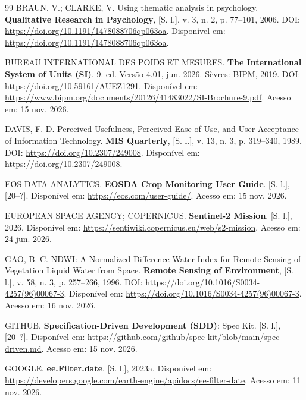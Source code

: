 \begin{thebibliography}{99}
\MakeUppercase{Braun}, V.; \MakeUppercase{Clarke}, V.
Using thematic analysis in psychology.
\textbf{Qualitative Research in Psychology}, [S. l.],
v. 3,
n. 2,
p. 77--101,
2006.
DOI: \url{https://doi.org/10.1191/1478088706qp063oa}.
Disponível em: \url{https://doi.org/10.1191/1478088706qp063oa}.

\MakeUppercase{{Bureau International des Poids et Mesures}}.
\textbf{The International System of Units (SI)}.
9. ed.
Versão 4.01, jun. 2026.
Sèvres: BIPM, 2019.
DOI: \url{https://doi.org/10.59161/AUEZ1291}.
Disponível em: \url{https://www.bipm.org/documents/20126/41483022/SI-Brochure-9.pdf}.
Acesso em: 15 nov. 2026.

\MakeUppercase{Davis}, F. D.
Perceived Usefulness, Perceived Ease of Use, and User Acceptance of Information Technology.
\textbf{MIS Quarterly}, [S. l.],
v. 13,
n. 3,
p. 319--340,
1989.
DOI: \url{https://doi.org/10.2307/249008}.
Disponível em: \url{https://doi.org/10.2307/249008}.

\MakeUppercase{{EOS Data Analytics}}.
\textbf{{EOSDA Crop Monitoring User Guide}}.
[S. l.], [20--?].
Disponível em: \url{https://eos.com/user-guide/}.
Acesso em: 15 nov. 2026.

\MakeUppercase{{European Space Agency}}; \MakeUppercase{{Copernicus}}.
\textbf{{Sentinel-2 Mission}}.
[S. l.], 2026.
Disponível em: \url{https://sentiwiki.copernicus.eu/web/s2-mission}.
Acesso em: 24 jun. 2026.

\MakeUppercase{Gao}, B.-C.
{NDWI}: A Normalized Difference Water Index for Remote Sensing of Vegetation Liquid Water from Space.
\textbf{Remote Sensing of Environment}, [S. l.],
v. 58,
n. 3,
p. 257--266,
1996.
DOI: \url{https://doi.org/10.1016/S0034-4257(96)00067-3}.
Disponível em: \url{https://doi.org/10.1016/S0034-4257(96)00067-3}.
Acesso em: 16 nov. 2026.

\MakeUppercase{{GitHub}}.
\textbf{Specification-Driven Development ({SDD})}: {Spec Kit}.
[S. l.], [20--?].
Disponível em: \url{https://github.com/github/spec-kit/blob/main/spec-driven.md}.
Acesso em: 15 nov. 2026.

\MakeUppercase{{Google}}.
\textbf{{ee.Filter.date}}.
[S. l.], 2023a.
Disponível em: \url{https://developers.google.com/earth-engine/apidocs/ee-filter-date}.
Acesso em: 11 nov. 2026.


\end{thebibliography}
